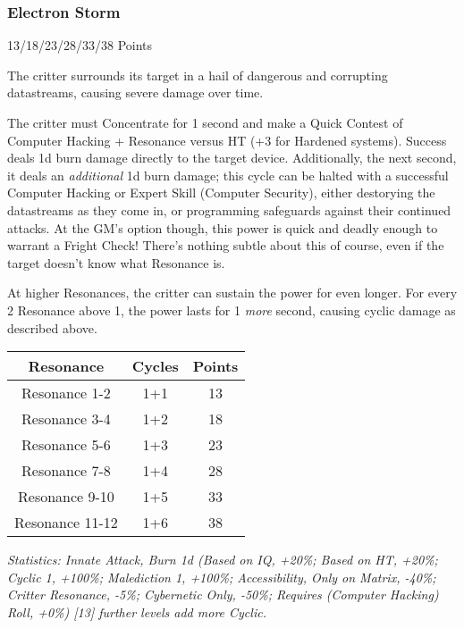 \begin{multicols*}{3}
	\subsubsection{Electron Storm}\label{electron_storm}
	\begin{flushright}
		13/18/23/28/33/38 Points
	\end{flushright}

	The critter surrounds its target in a hail of dangerous and corrupting datastreams, causing severe damage over time.
	
	The critter must Concentrate for 1 second and make a Quick Contest of Computer Hacking + Resonance versus HT (+3 for Hardened systems). Success deals 1d burn damage directly to the target device. Additionally, the next second, it deals an \textit{additional} 1d burn damage; this cycle can be halted with a successful Computer Hacking or Expert Skill (Computer Security), either destorying the datastreams as they come in, or programming safeguards against their continued attacks. At the GM's option though, this power is quick and deadly enough to warrant a Fright Check! There's nothing subtle about this of course, even if the target doesn't know what Resonance is.
	
	At higher Resonances, the critter can sustain the power for even longer. For every 2 Resonance above 1, the power lasts for 1 \textit{more} second, causing cyclic damage as described above.
	
	 	\begin{center}
	 	\begin{tabular}{|c|c|c|}
	 		\hline
	 		Resonance & Cycles & Points \\
	 		\hline
	 		\hline
	 		Resonance 1-2 & 1+1 & 13 \\
	 		Resonance 3-4 & 1+2 & 18 \\
	 		Resonance 5-6 & 1+3 & 23 \\
	 		Resonance 7-8 & 1+4 & 28 \\
	 		Resonance 9-10 & 1+5 & 33 \\
	 		Resonance 11-12 & 1+6 & 38 \\
	 		\hline
	 	\end{tabular}
	 \end{center}

	\textcolor{OliveGreen}{\textit{Statistics: Innate Attack, Burn 1d (Based on IQ, +20\%; Based on HT, +20\%; Cyclic 1, +100\%; Malediction 1, +100\%; Accessibility, Only on Matrix, -40\%; Critter Resonance, -5\%; Cybernetic Only, -50\%; Requires (Computer Hacking) Roll, +0\%) [13] further levels add more Cyclic.}}


\end{multicols*}
